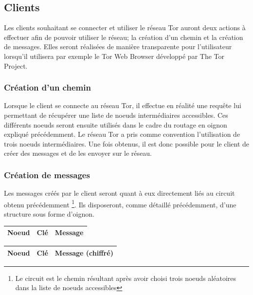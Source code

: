 \documentclass[letterpaper]{article}
\begin{document}
\subsection{Clients}
Les clients souhaitant se connecter et utiliser le réseau Tor auront deux actions à effectuer afin de pouvoir utiliser le réseau; la création d'un chemin et la création de messages. Elles seront réalisées de manière transparente pour l'utilisateur lorsqu'il utilisera par exemple le Tor Web Browser développé par The Tor Project.
\subsubsection{Création d'un chemin} Lorsque le client se connecte au réseau Tor, il effectue en réalité une requête lui permettant de récupérer une liste de noeuds intermédiaires accessibles. Ces différents noeuds seront ensuite utilisés dans le cadre du routage en oignon expliqué précédemment. Le réseau Tor a pris comme convention l'utilisation de trois noeuds intermédiaires. Une fois obtenus, il est donc possible pour le client de créer des messages et de les envoyer sur le réseau.
\subsubsection{Création de messages} Les messages créés par le client seront quant à eux directement liés au circuit obtenu précédemment \footnote{Le circuit est le chemin résultant après avoir choisi trois noeuds aléatoires dans la liste de noeuds accessibles}. Ils disposeront, comme détaillé précédemment, d'une structure sous forme d'oignon. \\
\vspace{2pt}
\begin{table}[!htbp]
\centering
\begin{tabular}{|l|l|l|}
\hline
Noeud & Clé & Message \\ \hline
\end{tabular}
\end{table}

\begin{table}[!htbp]
\centering
\begin{tabular}{|l|l|l|}
\hline
Noeud & Clé & Message (chiffré) \\ \hline
\end{tabular}
\end{table}
\end{document}
